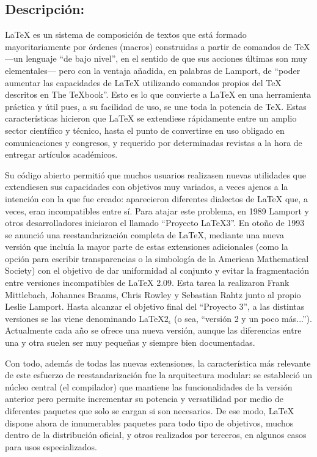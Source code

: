 \documentclass[12pt,a4paper,spanish]{book}
\begin{document}
\subsection{Descripci\'on:}
\LaTeX{} es un sistema de composici\'on de textos que est\'a formado mayoritariamente por \'ordenes (macros) construidas a partir de comandos de \TeX{} ---un lenguaje ``de bajo nivel'', en el sentido de que sus acciones \'ultimas son muy elementales--- pero con la ventaja a\~nadida, en palabras de Lamport, de ``poder aumentar las capacidades de \LaTeX{} utilizando comandos propios del \TeX{} descritos en The TeXbook''. Esto es lo que convierte a \LaTeX{} en una herramienta pr\'actica y \'util pues, a su facilidad de uso, se une toda la potencia de \TeX{}. Estas caracter\'isticas hicieron que \LaTeX{} se extendiese r\'apidamente entre un amplio sector cient\'ifico y t\'ecnico, hasta el punto de convertirse en uso obligado en comunicaciones y congresos, y requerido por determinadas revistas a la hora de entregar art\'iculos acad\'emicos.

Su c\'odigo abierto permiti\'o que muchos usuarios realizasen nuevas utilidades que extendiesen sus capacidades con objetivos muy variados, a veces ajenos a la intenci\'on con la que fue creado: aparecieron diferentes dialectos de \LaTeX{} que, a veces, eran incompatibles entre s\'i. Para atajar este problema, en 1989 Lamport y otros desarrolladores iniciaron el llamado ``Proyecto LaTeX3''. En oto\~no de 1993 se anunci\'o una reestandarizaci\'on completa de \LaTeX{}, mediante una nueva versi\'on que inclu\'ia la mayor parte de estas extensiones adicionales (como la opci\'on para escribir transparencias o la simbolog\'ia de la American Mathematical Society) con el objetivo de dar uniformidad al conjunto y evitar la fragmentaci\'on entre versiones incompatibles de \LaTeX{} 2.09. Esta tarea la realizaron Frank Mittlebach, Johannes Braams, Chris Rowley y Sebastian Rahtz junto al propio Leslie Lamport. Hasta alcanzar el objetivo final del ``Proyecto 3'', a las distintas versiones se las viene denominando \LaTeX{}$2_\epsilon$ (o sea, ``versi\'on 2 y un poco m\'as...''). Actualmente cada a\~no se ofrece una nueva versi\'on, aunque las diferencias entre una y otra suelen ser muy peque\~nas y siempre bien documentadas.


Con todo, adem\'as de todas las nuevas extensiones, la caracter\'istica m\'as relevante de este esfuerzo de reestandarizaci\'on fue la arquitectura modular: se estableci\'o un n\'ucleo central (el compilador) que mantiene las funcionalidades de la versi\'on anterior pero permite incrementar su potencia y versatilidad por medio de diferentes paquetes que solo se cargan si son necesarios. De ese modo, \LaTeX{} dispone ahora de innumerables paquetes para todo tipo de objetivos, muchos dentro de la distribuci\'on oficial, y otros realizados por terceros, en algunos casos para usos especializados.
\end{document}
